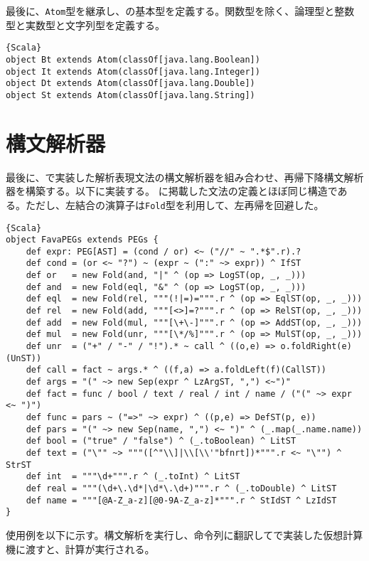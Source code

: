 \documentclass[10pt,a4paper]{book}
\begin{document}
最後に、\texttt{Atom}型を継承し、の基本型を定義する。関数型を除く、論理型と整数型と実数型と文字列型を定義する。

\begin{Verbatim}{Scala}
object Bt extends Atom(classOf[java.lang.Boolean])
object It extends Atom(classOf[java.lang.Integer])
object Dt extends Atom(classOf[java.lang.Double])
object St extends Atom(classOf[java.lang.String])
\end{Verbatim}

\section{構文解析器}

最後に、で実装した解析表現文法の構文解析器を組み合わせ、再帰下降構文解析器を構築する。以下に実装する。
に掲載した文法の定義とほぼ同じ構造である。ただし、左結合の演算子は\texttt{Fold}型を利用して、左再帰を回避した。

\begin{Verbatim}{Scala}
object FavaPEGs extends PEGs {
	def expr: PEG[AST] = (cond / or) <~ ("//" ~ ".*$".r).?
	def cond = (or <~ "?") ~ (expr ~ (":" ~> expr)) ^ IfST
	def or   = new Fold(and, "|" ^ (op => LogST(op, _, _)))
	def and  = new Fold(eql, "&" ^ (op => LogST(op, _, _)))
	def eql  = new Fold(rel, """(!|=)=""".r ^ (op => EqlST(op, _, _)))
	def rel  = new Fold(add, """[<>]=?""".r ^ (op => RelST(op, _, _)))
	def add  = new Fold(mul, """[\+\-]""".r ^ (op => AddST(op, _, _)))
	def mul  = new Fold(unr, """[\*/%]""".r ^ (op => MulST(op, _, _)))
	def unr  = ("+" / "-" / "!").* ~ call ^ ((o,e) => o.foldRight(e)(UnST))
	def call = fact ~ args.* ^ ((f,a) => a.foldLeft(f)(CallST))
	def args = "(" ~> new Sep(expr ^ LzArgST, ",") <~")"
	def fact = func / bool / text / real / int / name / ("(" ~> expr <~ ")")
	def func = pars ~ ("=>" ~> expr) ^ ((p,e) => DefST(p, e))
	def pars = "(" ~> new Sep(name, ",") <~ ")" ^ (_.map(_.name.name))
	def bool = ("true" / "false") ^ (_.toBoolean) ^ LitST
	def text = ("\"" ~> """([^"\\]|\\[\\'"bfnrt])*""".r <~ "\"") ^ StrST
	def int  = """\d+""".r ^ (_.toInt) ^ LitST
	def real = """(\d+\.\d*|\d*\.\d+)""".r ^ (_.toDouble) ^ LitST
	def name = """[@A-Z_a-z][@0-9A-Z_a-z]*""".r ^ StIdST ^ LzIdST
}
\end{Verbatim}

使用例を以下に示す。構文解析を実行し、命令列に翻訳してで実装した仮想計算機に渡すと、計算が実行される。
\end{document}
